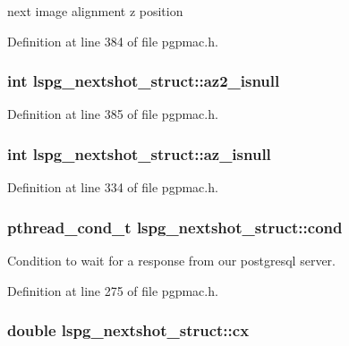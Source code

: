 next image alignment z position 



Definition at line 384 of file pgpmac.\-h.

\hypertarget{structlspg__nextshot__struct_a95d080f13a4e02b9aa883821ee3e721c}{
\subsubsection[{az2\-\_\-isnull}]{\setlength{\rightskip}{0pt plus 5cm}int lspg\-\_\-nextshot\-\_\-struct\-::az2\-\_\-isnull}}\label{structlspg__nextshot__struct_a95d080f13a4e02b9aa883821ee3e721c}


Definition at line 385 of file pgpmac.\-h.

\hypertarget{structlspg__nextshot__struct_aaebd6d432810313294b5fed5f4445cb1}{
\subsubsection[{az\-\_\-isnull}]{\setlength{\rightskip}{0pt plus 5cm}int lspg\-\_\-nextshot\-\_\-struct\-::az\-\_\-isnull}}\label{structlspg__nextshot__struct_aaebd6d432810313294b5fed5f4445cb1}


Definition at line 334 of file pgpmac.\-h.

\hypertarget{structlspg__nextshot__struct_afc773a9eefc173aa98d5c2889e1d7669}{
\subsubsection[{cond}]{\setlength{\rightskip}{0pt plus 5cm}pthread\-\_\-cond\-\_\-t lspg\-\_\-nextshot\-\_\-struct\-::cond}}\label{structlspg__nextshot__struct_afc773a9eefc173aa98d5c2889e1d7669}


Condition to wait for a response from our postgresql server. 



Definition at line 275 of file pgpmac.\-h.

\hypertarget{structlspg__nextshot__struct_ad9eb2013fa6f295f72f0891fe98c863f}{
\subsubsection[{cx}]{\setlength{\rightskip}{0pt plus 5cm}double lspg\-\_\-nextshot\-\_\-struct\-::cx}}\label{structlspg__nextshot__struct_ad9eb2013fa6f295f72f0891fe98c863f}


